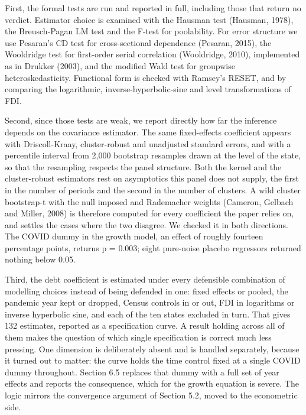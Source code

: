 \documentclass[12pt,a4paper]{article}
\begin{document}
First, the formal tests are run and reported in full, including those that return no verdict. Estimator choice is examined with the Hausman test (Hausman, 1978), the Breusch-Pagan LM test and the F-test for poolability. For error structure we use Pesaran's CD test for cross-sectional dependence (Pesaran, 2015), the Wooldridge test for first-order serial correlation (Wooldridge, 2010), implemented as in Drukker (2003), and the modified Wald test for groupwise heteroskedasticity. Functional form is checked with Ramsey's RESET, and by comparing the logarithmic, inverse-hyperbolic-sine and level transformations of FDI.

Second, since those tests are weak, we report directly how far the inference depends on the covariance estimator. The same fixed-effects coefficient appears with Driscoll-Kraay, cluster-robust and unadjusted standard errors, and with a percentile interval from 2,000 bootstrap resamples drawn at the level of the state, so that the resampling respects the panel structure. Both the kernel and the cluster-robust estimators rest on asymptotics this panel does not supply, the first in the number of periods and the second in the number of clusters. A wild cluster bootstrap-t with the null imposed and Rademacher weights (Cameron, Gelbach and Miller, 2008) is therefore computed for every coefficient the paper relies on, and settles the cases where the two disagree. We checked it in both directions. The COVID dummy in the growth model, an effect of roughly fourteen percentage points, returns p = 0.003; eight pure-noise placebo regressors returned nothing below 0.05.

Third, the debt coefficient is estimated under every defensible combination of modelling choices instead of being defended in one: fixed effects or pooled, the pandemic year kept or dropped, Census controls in or out, FDI in logarithms or inverse hyperbolic sine, and each of the ten states excluded in turn. That gives 132 estimates, reported as a specification curve. A result holding across all of them makes the question of which single specification is correct much less pressing. One dimension is deliberately absent and is handled separately, because it turned out to matter: the curve holds the time control fixed at a single COVID dummy throughout. Section 6.5 replaces that dummy with a full set of year effects and reports the consequence, which for the growth equation is severe. The logic mirrors the convergence argument of Section 5.2, moved to the econometric side.

\FloatBarrier
\end{document}
